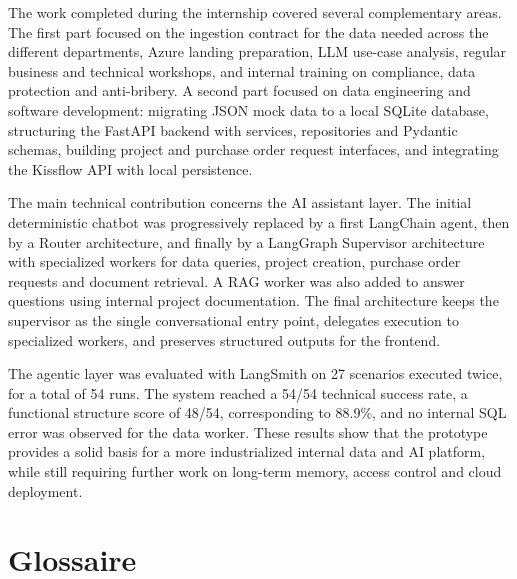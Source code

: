 \documentclass[a4paper,11pt,english,openany]{book}
\begin{document}
The work completed during the internship covered several complementary areas. The first part focused on the ingestion contract for the data needed across the different departments, Azure landing preparation, LLM use-case analysis, regular business and technical workshops, and internal training on compliance, data protection and anti-bribery. A second part focused on data engineering and software development: migrating JSON mock data to a local SQLite database, structuring the FastAPI backend with services, repositories and Pydantic schemas, building project and purchase order request interfaces, and integrating the Kissflow API with local persistence.

The main technical contribution concerns the AI assistant layer. The initial deterministic chatbot was progressively replaced by a first LangChain agent, then by a Router architecture, and finally by a LangGraph Supervisor architecture with specialized workers for data queries, project creation, purchase order requests and document retrieval. A RAG worker was also added to answer questions using internal project documentation. The final architecture keeps the supervisor as the single conversational entry point, delegates execution to specialized workers, and preserves structured outputs for the frontend.

The agentic layer was evaluated with LangSmith on 27 scenarios executed twice, for a total of 54 runs. The system reached a 54/54 technical success rate, a functional structure score of 48/54, corresponding to 88.9\%, and no internal SQL error was observed for the data worker. These results show that the prototype provides a solid basis for a more industrialized internal data and AI platform, while still requiring further work on long-term memory, access control and cloud deployment.
\chapter*{Glossaire}
\end{document}
